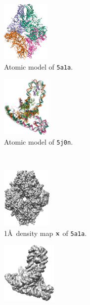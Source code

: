 \begin{figure}[ht!]
    \centering
    \begin{minipage}[b]{0.51\linewidth}
        \centering
        \begin{subfigure}[b]{0.49\linewidth}
            \centering
            \includegraphics[height=3cm]{figures/5a1a_pdb.png}
            \caption{Atomic model of \texttt{5a1a}.}
        \end{subfigure}
        \hfill
        \begin{subfigure}[b]{0.49\linewidth}
            \centering
            \includegraphics[height=3cm]{figures/5j0n_pdb_.png}
            \caption{Atomic model of \texttt{5j0n}.}
        \end{subfigure}
        \\ \vspace{0.5em}
        \begin{subfigure}[b]{0.49\linewidth}
            \centering
            \includegraphics[height=3cm]{figures/5a1a_5A.png}
            \caption{1\AA\ density map $\mathbf{x}$ of \texttt{5a1a}.}%
            \label{fig:density-map:5j0n:ground-truth}
        \end{subfigure}
        \hfill
        \begin{subfigure}[b]{0.49\linewidth}
            \centering
            \includegraphics[height=3cm]{figures/5j0n_5A.png}

\end{subfigure}
\end{minipage}
\end{figure}
